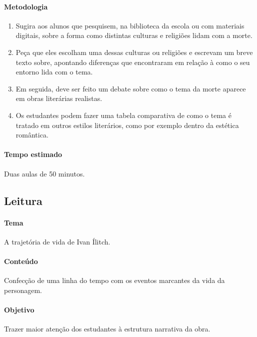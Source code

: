 \documentclass[12pt]{extarticle}
\begin{document}
\paragraph{Metodologia} 

\begin{enumerate}

\item Sugira aos alunos que pesquisem, na biblioteca da escola ou
com materiais digitais, sobre a forma como distintas culturas e religiões
lidam com a morte.

\item Peça que eles escolham uma dessas culturas ou religiões e
escrevam um breve texto sobre, apontando diferenças que encontraram
em relação à como o seu entorno lida com o tema.

\item Em seguida, deve ser feito um debate sobre como o tema da morte aparece
em obras literárias realistas.

\item Os estudantes podem fazer uma tabela comparativa de como o tema
é tratado em outros estilos literários, como por exemplo dentro da estética romântica.

\end{enumerate}
\paragraph{Tempo estimado} Duas aulas de 50 minutos.


\subsection{Leitura}



\paragraph{Tema} A trajetória de vida de Ivan Ílitch.

\paragraph{Conteúdo} Confecção de uma linha do tempo com os eventos
marcantes da vida da personagem.

\paragraph{Objetivo} Trazer maior atenção dos estudantes à estrutura
narrativa da obra.
\end{document}
